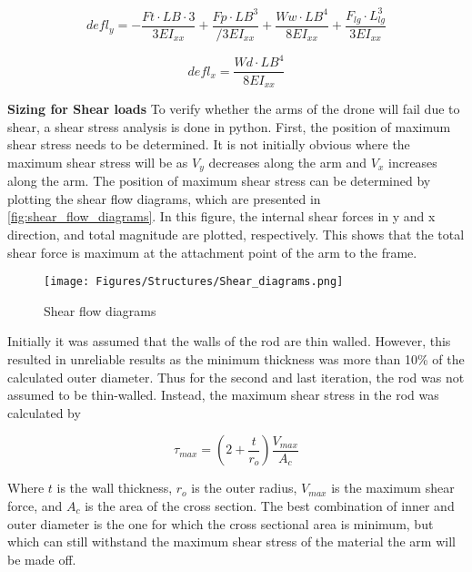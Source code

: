\begin{equation} \label{eq:defly}
    defl_y = -\frac{Ft\cdot LB\cdot 3}{3EI_{xx}} + \frac{Fp\cdot LB^3}{/3EI_{xx}} + \frac{Ww\cdot LB^4}{8EI_{xx}} + \frac{F_{lg} \cdot L_{lg}^3}{3EI_{xx}}
\end{equation}

\begin{equation}\label{eq:deflx}
   defl_x = \frac{Wd\cdot LB^4}{8EI_{xx}}
\end{equation}


\textbf{Sizing for Shear loads} \newline
To verify whether the arms of the drone will fail due to shear, a shear stress analysis is done in python. First, the position of maximum shear stress needs to be determined. It is not initially obvious where the maximum shear stress will be as $V_y$ decreases along the arm and $V_x$ increases along the arm. The position of maximum shear stress can be determined by plotting the shear flow diagrams, which are presented in \autoref{fig:shear_flow_diagrams}.  In this figure, the internal shear forces in y and x direction, and total magnitude are plotted, respectively. This shows that the total shear force is maximum at the attachment point of the arm to the frame. 

\begin{figure}[h!]
    \centering
    \texttt{[image: Figures/Structures/Shear\_diagrams.png]}
    \caption{Shear flow diagrams}
    \label{fig:shear_flow_diagrams}
\end{figure}

Initially it was assumed that the walls of the rod are thin walled. However, this resulted in unreliable results as the minimum thickness was more than 10\% of the calculated outer diameter. Thus for the second and last iteration, the rod was not assumed to be thin-walled. Instead, the maximum shear stress in the rod was calculated by \cite{shear_stress_ref}

\begin{equation}
    \tau_{max} = \left ( 2 + \frac{t}{r_o}\right ) \frac{V_{max}}{A_c} 
\end{equation}

Where $t$ is the wall thickness, $r_o$ is the outer radius, $V_{max}$ is the maximum shear force, and $A_c$ is the area of the cross section. 
The best combination of inner and outer diameter is the one for which the cross sectional area is minimum, but which can still withstand the maximum shear stress of the material the arm will be made off. 

